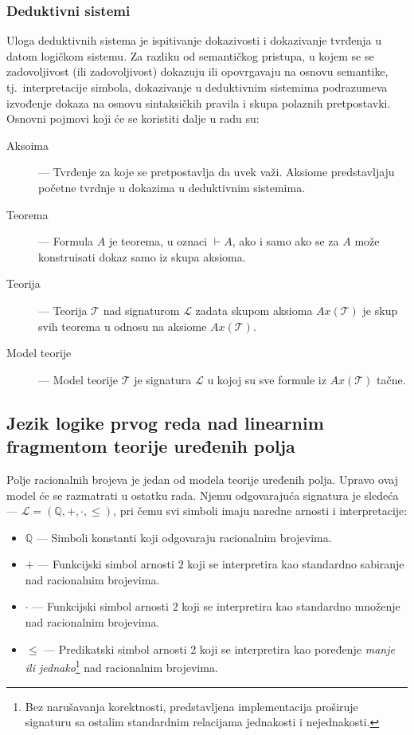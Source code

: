 \documentclass[a4paper,10pt]{article}
\begin{document}
\subsubsection{Deduktivni sistemi}

Uloga deduktivnih sistema je ispitivanje dokazivosti i dokazivanje tvrđenja u datom logičkom sistemu. Za razliku od semantičkog pristupa, u kojem se se zadovoljivost (ili zadovoljivost) dokazuju ili opovrgavaju na osnovu semantike, tj.~interpretacije simbola, dokazivanje u deduktivnim sistemima podrazumeva izvođenje dokaza na osnovu sintaksičkih pravila i skupa polaznih pretpostavki. Osnovni pojmovi koji će se koristiti dalje u radu su:

\begin{description}
    \item[Aksoima] --- Tvrđenje za koje se pretpostavlja da uvek važi. Aksiome predstavljaju početne tvrdnje u dokazima u deduktivnim sistemima.
    \item[Teorema] --- Formula $A$ je teorema, u oznaci $\vdash A$, ako i samo ako se za $A$ može konstruisati dokaz samo iz skupa aksioma.
    \item[Teorija] --- Teorija $\mathcal{T}$ nad signaturom $\mathcal{L}$ zadata skupom aksioma $Ax(\mathcal{T})$ je skup svih teorema u odnosu na aksiome $Ax(\mathcal{T})$.
    \item[Model teorije] --- Model teorije $\mathcal{T}$ je signatura $\mathcal{L}$ u kojoj su sve formule iz $Ax(\mathcal{T})$ tačne.
\end{description}

\subsection{Jezik logike prvog reda nad linearnim fragmentom teorije uređenih polja}
\label{subsec:teorija_uredjenih_polja}

Polje racionalnih brojeva je jedan od modela teorije uređenih polja. Upravo ovaj model će se razmatrati u ostatku rada. Njemu odgovarajuća signatura je sledeća --- $\mathcal{L} = (\mathbb{Q}, +, \cdot, \leq)$, pri čemu svi simboli imaju naredne arnosti i interpretacije:
\begin{itemize}
    \item $\mathbb{Q}$ --- Simboli konstanti koji odgovaraju racionalnim brojevima.
    \item $+$ --- Funkcijski simbol arnosti $2$ koji se interpretira kao standardno sabiranje nad racionalnim brojevima.
    \item $\cdot$ --- Funkcijski simbol arnosti $2$ koji se interpretira kao standardno množenje nad racionalnim brojevima.
    \item $\leq$ --- Predikatski simbol arnosti $2$ koji se interpretira kao poređenje \textit{manje ili jednako}\footnote{Bez narušavanja korektnosti, predstavljena implementacija proširuje signaturu sa ostalim standardnim relacijama jednakosti i nejednakosti.} nad racionalnim brojevima.
\end{itemize}
\end{document}

